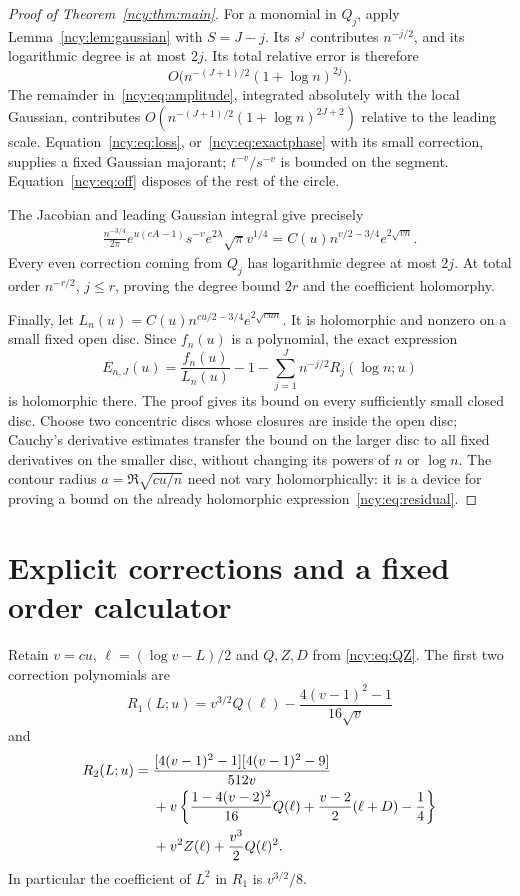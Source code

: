 \documentclass[11pt,letterpaper]{article}
\numberwithin{equation}{section}
\theoremstyle{remark}\newtheorem{remark}[theorem]{Remark}
\theoremstyle{definition}\newtheorem{definition}[theorem]{Definition}\theoremstyle{plain}
\begin{document}
\begin{proof}[Proof of Theorem~\ref{ncy:thm:main}]
For a monomial in $Q_j$, apply Lemma~\ref{ncy:lem:gaussian} with $S=J-j$.
Its $s^j$ contributes $n^{-j/2}$, and its logarithmic degree is at most
$2j$. Its total relative error is therefore
\[
 O\bigl(n^{-(J+1)/2}(1+\log n)^{2j}\bigr).
\]
The remainder in~\eqref{ncy:eq:amplitude}, integrated absolutely with the
local Gaussian, contributes
$O(n^{-(J+1)/2}(1+\log n)^{2J+2})$ relative to the leading scale.
Equation~\eqref{ncy:eq:loss}, or~\eqref{ncy:eq:exactphase} with its small
correction, supplies a fixed Gaussian majorant; $t^{-v}/s^{-v}$ is
bounded on the segment. Equation~\eqref{ncy:eq:off} disposes of the
rest of the circle.

The Jacobian and leading Gaussian integral give precisely
\begin{align*}
 \frac{n^{-3/4}}{2\pi}e^{u(cA-1)}s^{-v}e^{2\lambda}
           \sqrt\pi v^{1/4}
       =C(u)n^{v/2-3/4}e^{2\sqrt{vn}}.
\end{align*}
Every even correction coming from $Q_j$ has logarithmic degree at
most $2j$. At total order $n^{-r/2}$, $j\leq r$, proving the degree
bound $2r$ and the coefficient holomorphy.

Finally, let $L_n(u)=C(u)n^{cu/2-3/4}e^{2\sqrt{cun}}$. It is
holomorphic and nonzero on a small fixed open disc. Since $f_n(u)$ is
a polynomial, the exact expression
\begin{equation}\label{ncy:eq:residual}
 E_{n,J}(u)=\frac{f_n(u)}{L_n(u)}-1
              -\sum_{j=1}^Jn^{-j/2}R_j(\log n;u)
\end{equation}
is holomorphic there. The proof gives its bound on every sufficiently
small closed disc. Choose two concentric discs whose closures are
inside the open disc; Cauchy's derivative estimates transfer the bound
on the larger disc to all fixed derivatives on the smaller disc,
without changing its powers of $n$ or $\log n$. The contour radius
$a=\Re\sqrt{cu/n}$ need not vary holomorphically: it is a device for
proving a bound on the already holomorphic expression~\eqref{ncy:eq:residual}.
\end{proof}

\section{Explicit corrections and a fixed order calculator}\label{ncy:sec:corrections}
Retain $v=cu$, $\ell=(\log v-L)/2$ and $Q,Z,D$ from
\eqref{ncy:eq:QZ}. The first two correction polynomials are
\begin{equation}\label{ncy:eq:R1}
 R_1(L;u)=v^{3/2}Q(\ell)
              -\frac{4(v-1)^2-1}{16\sqrt v}
\end{equation}
and
\begin{align}\label{ncy:eq:R2}
 R_2(L;u)={}&\frac{[4(v-1)^2-1][4(v-1)^2-9]}{512v}\notag\\
 &+v\left\{\frac{1-4(v-2)^2}{16}Q(\ell)
              +\frac{v-2}{2}(\ell+D)-\frac14\right\}\notag\\
 &+v^2Z(\ell)+\frac{v^3}{2}Q(\ell)^2.
\end{align}
In particular the coefficient of $L^2$ in $R_1$ is $v^{3/2}/8$.
\end{document}
